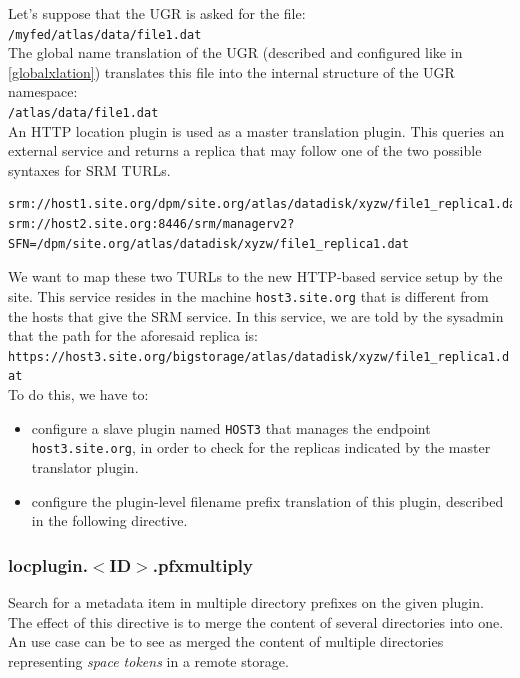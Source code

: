 \documentclass[12pt]{article} %
\begin{document}
Let's suppose that the UGR is asked for the file:\\

\lstinline"/myfed/atlas/data/file1.dat" \\

The global name translation of the UGR (described and configured like in \ref{globalxlation}) translates this file into the internal structure of the UGR namespace:\\

\lstinline"/atlas/data/file1.dat"\\

An HTTP location plugin is used as a master translation plugin. This queries an external service and returns a replica that may follow one of the two possible syntaxes for SRM TURLs.\\

\begin{lstlisting}
srm://host1.site.org/dpm/site.org/atlas/datadisk/xyzw/file1_replica1.dat
srm://host2.site.org:8446/srm/managerv2? SFN=/dpm/site.org/atlas/datadisk/xyzw/file1_replica1.dat
\end{lstlisting}

We want to map these two TURLs to the new HTTP-based service setup by the site. This service resides in the machine \lstinline"host3.site.org" that is different from the hosts that give the SRM service. In this service, we are told by the sysadmin that the path for the aforesaid replica is:\\

\lstinline"https://host3.site.org/bigstorage/atlas/datadisk/xyzw/file1_replica1.dat"\\




To do this, we have to:

\begin{itemize}
 \item configure a slave plugin named \lstinline"HOST3" that manages the endpoint \lstinline"host3.site.org", in order to check for the replicas indicated by the master translator plugin.
 \item configure the plugin-level filename prefix translation of this plugin, described in the following directive.
\end{itemize}


\subsubsection{locplugin.$<$ID$>$.pfxmultiply}
Search for a metadata item in multiple directory prefixes on the given plugin. The effect of this directive is to merge the content of several directories into one. An use case can be to see as merged the content of multiple directories representing \textit{space tokens} in a remote storage.\\
\end{document}
